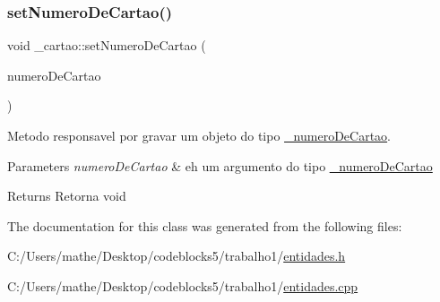 \subsubsection{\texorpdfstring{setNumeroDeCartao()}{setNumeroDeCartao()}}
{\footnotesize\ttfamily void \+\_\+cartao\+::set\+Numero\+De\+Cartao (\begin{DoxyParamCaption}\item[{const \mbox{\hyperlink{class__numero_de_cartao}{\+\_\+numero\+De\+Cartao}} \&}]{numero\+De\+Cartao }\end{DoxyParamCaption})}



Metodo responsavel por gravar um objeto do tipo \mbox{\hyperlink{class__numero_de_cartao}{\+\_\+numero\+De\+Cartao}}. 


\begin{DoxyParams}{Parameters}
{\em numero\+De\+Cartao} & eh um argumento do tipo \mbox{\hyperlink{class__numero_de_cartao}{\+\_\+numero\+De\+Cartao}} \\
\hline
\end{DoxyParams}
\begin{DoxyReturn}{Returns}
Retorna void 
\end{DoxyReturn}


The documentation for this class was generated from the following files\+:\begin{DoxyCompactItemize}
\item 
C\+:/\+Users/mathe/\+Desktop/codeblocks5/trabalho1/\mbox{\hyperlink{entidades_8h}{entidades.\+h}}\item 
C\+:/\+Users/mathe/\+Desktop/codeblocks5/trabalho1/\mbox{\hyperlink{entidades_8cpp}{entidades.\+cpp}}\end{DoxyCompactItemize}
